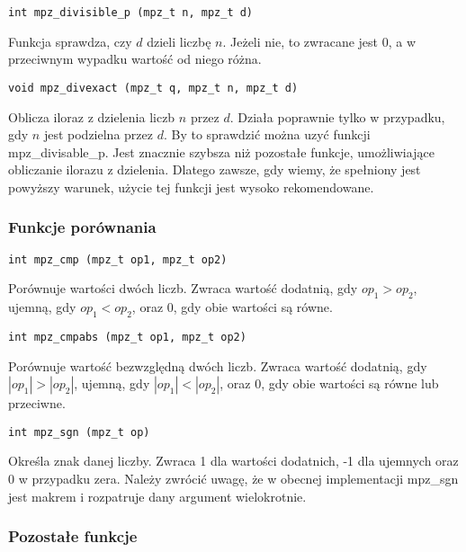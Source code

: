 \documentclass[twoside,a4paper]{book}
\begin{document}
\begin{lstlisting}
int mpz_divisible_p (mpz_t n, mpz_t d)
\end{lstlisting}

Funkcja sprawdza, czy $d$ dzieli liczbę $n$. Jeżeli nie, to zwracane jest $0$, a w przeciwnym wypadku wartość od niego różna.

\begin{lstlisting}
void mpz_divexact (mpz_t q, mpz_t n, mpz_t d)
\end{lstlisting}

Oblicza iloraz z dzielenia liczb $n$ przez $d$. Działa poprawnie tylko w przypadku, gdy $n$ jest podzielna przez $d$. By to sprawdzić można uzyć funkcji mpz\_divisable\_p. Jest znacznie szybsza niż pozostałe funkcje, umożliwiające obliczanie ilorazu z dzielenia. Dlatego zawsze, gdy wiemy, że spełniony jest powyższy warunek, użycie tej funkcji jest wysoko rekomendowane.

\subsubsection{Funkcje porównania}

\begin{lstlisting}
int mpz_cmp (mpz_t op1, mpz_t op2)
\end{lstlisting}

Porównuje wartości dwóch liczb. Zwraca wartość dodatnią, gdy $op_1>op_2$, ujemną, gdy $op_1<op_2$, oraz $0$, gdy obie wartości są równe.

\begin{lstlisting}
int mpz_cmpabs (mpz_t op1, mpz_t op2)
\end{lstlisting}

Porównuje wartość bezwzględną dwóch liczb. Zwraca wartość dodatnią, gdy $|op_1|>|op_2|$, ujemną, gdy $|op_1|<|op_2|$, oraz $0$, gdy obie wartości są równe lub przeciwne.

\begin{lstlisting}
int mpz_sgn (mpz_t op)
\end{lstlisting}

Określa znak danej liczby. Zwraca 1 dla wartości dodatnich, -1 dla ujemnych oraz $0$ w przypadku zera. Należy zwrócić uwagę, że w obecnej implementacji mpz\_sgn jest makrem i rozpatruje dany argument wielokrotnie.

\subsubsection{Pozostałe funkcje}
\end{document}
